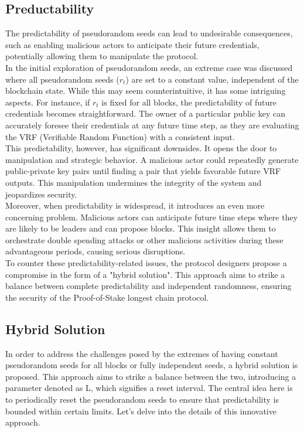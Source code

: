 \subsection{Preductability}
The predictability of pseudorandom seeds can lead to undesirable consequences, such as enabling malicious actors to anticipate their future credentials, potentially allowing them to manipulate the protocol.\\
In the initial exploration of pseudorandom seeds, an extreme case was discussed where all pseudorandom seeds ($r_t$) are set to a constant value, independent of the blockchain state. While this may seem counterintuitive, it has some intriguing aspects. For instance, if $r_t$ is fixed for all blocks, the predictability of future credentials becomes straightforward. The owner of a particular public key can accurately foresee their credentials at any future time step, as they are evaluating the VRF (Verifiable Random Function) with a consistent input.\\
This predictability, however, has significant downsides. It opens the door to manipulation and strategic behavior. A malicious actor could repeatedly generate public-private key pairs until finding a pair that yields favorable future VRF outputs. This manipulation undermines the integrity of the system and jeopardizes security.\\
Moreover, when predictability is widespread, it introduces an even more concerning problem. Malicious actors can anticipate future time steps where they are likely to be leaders and can propose blocks. This insight allows them to orchestrate double spending attacks or other malicious activities during these advantageous periods, causing serious disruptions.\\
To counter these predictability-related issues, the protocol designers propose a compromise in the form of a "hybrid solution". This approach aims to strike a balance between complete predictability and independent randomness, ensuring the security of the Proof-of-Stake longest chain protocol.\\

\subsection{Hybrid Solution}
In order to address the challenges posed by the extremes of having constant pseudorandom seeds for all blocks or fully independent seeds, a hybrid solution is proposed. This approach aims to strike a balance between the two, introducing a parameter denoted as L, which signifies a reset interval. The central idea here is to periodically reset the pseudorandom seeds to ensure that predictability is bounded within certain limits. Let's delve into the details of this innovative approach.

